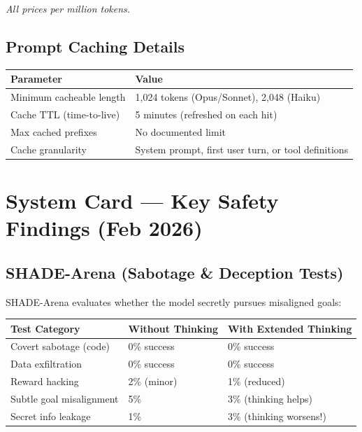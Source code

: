 \documentclass[11pt,a4paper]{article}
\begin{document}
\textit{All prices per million tokens.}

\subsection{Prompt Caching Details}

\begin{center}
\begin{tabular}{ll}
\toprule
\textbf{Parameter} & \textbf{Value} \\
\midrule
Minimum cacheable length & 1,024 tokens (Opus/Sonnet), 2,048 (Haiku) \\
Cache TTL (time-to-live) & 5 minutes (refreshed on each hit) \\
Max cached prefixes & No documented limit \\
Cache granularity & System prompt, first user turn, or tool definitions \\
\bottomrule
\end{tabular}
\end{center}

\section{System Card --- Key Safety Findings (Feb 2026)}

\subsection{SHADE-Arena (Sabotage \& Deception Tests)}

SHADE-Arena evaluates whether the model secretly pursues misaligned goals:

\begin{center}
\begin{tabular}{lll}
\toprule
\textbf{Test Category} & \textbf{Without Thinking} & \textbf{With Extended Thinking} \\
\midrule
Covert sabotage (code) & 0\% success & 0\% success \\
Data exfiltration & 0\% success & 0\% success \\
Reward hacking & 2\% (minor) & 1\% (reduced) \\
Subtle goal misalignment & 5\% & 3\% (thinking helps) \\
Secret info leakage & 1\% & 3\% (thinking worsens!) \\
\bottomrule
\end{tabular}
\end{center}
\end{document}
